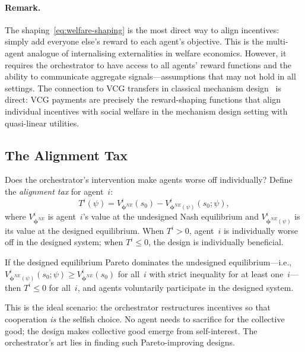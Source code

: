\paragraph{Remark.} The shaping~\eqref{eq:welfare-shaping} is the most direct way to align incentives: simply add everyone else's reward to each agent's objective. This is the multi-agent analogue of internalising externalities in welfare economics. However, it requires the orchestrator to have access to all agents' reward functions and the ability to communicate aggregate signals---assumptions that may not hold in all settings. The connection to VCG transfers in classical mechanism design~\cite{vickrey1961,clarke1971,groves1973} is direct: VCG payments are precisely the reward-shaping functions that align individual incentives with social welfare in the mechanism design setting with quasi-linear utilities.

\subsection{The Alignment Tax}
\label{subsec:alignment-tax}

Does the orchestrator's intervention make agents worse off individually? Define the \emph{alignment tax} for agent~$i$:
\begin{equation}\label{eq:alignment-tax}
  T^i(\psi) = V^i_{\bm{\phi}^{NE}}(s_0) - V^i_{\bm{\phi}^{NE}(\psi)}(s_0;\psi),
\end{equation}
where $V^i_{\bm{\phi}^{NE}}$ is agent~$i$'s value at the undesigned Nash equilibrium and $V^i_{\bm{\phi}^{NE}(\psi)}$ is its value at the designed equilibrium. When $T^i > 0$, agent~$i$ is individually worse off in the designed system; when $T^i \leq 0$, the design is individually beneficial.

\begin{proposition}\label{prop:voluntary}
If the designed equilibrium Pareto dominates the undesigned equilibrium---i.e., $V^i_{\bm{\phi}^{NE}(\psi)}(s_0;\psi) \geq V^i_{\bm{\phi}^{NE}}(s_0)$ for all~$i$ with strict inequality for at least one~$i$---then $T^i \leq 0$ for all~$i$, and agents voluntarily participate in the designed system.
\end{proposition}

This is the ideal scenario: the orchestrator restructures incentives so that cooperation \emph{is} the selfish choice. No agent needs to sacrifice for the collective good; the design makes collective good emerge from self-interest. The orchestrator's art lies in finding such Pareto-improving designs.

